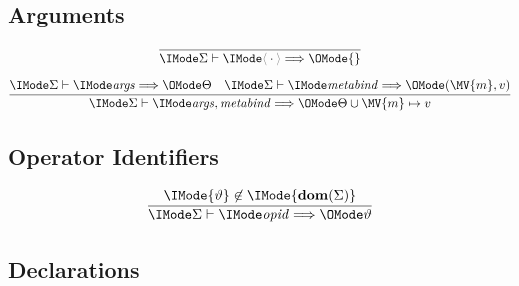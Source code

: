\documentclass{report}
\begin{document}
\subsection*{Arguments\hfill \framebox{$\Elab{\Sigma}{\SortArgs}{\Theta}$}}

\begin{gather}
  \infer{
    \Elab{\Sigma}{\EmptyCtx}{\{\}}
  }{
  }\\[6pt]
  \infer{
    \Elab{\Sigma}{\ExtendCtx{\SortArgs}{\SortMetaBind}}{
      \Theta\cup{\MV{m} \mapsto v}
    }
  }{
    \Elab{\Sigma}{\SortArgs}{\Theta} &
    \Elab{\Sigma}{\SortMetaBind}{(\MV{m}, v)}
  }
\end{gather}

\subsection*{Operator Identifiers\hfill \framebox{$\Elab{\Sigma}{\SortOpId}{\vartheta}$}}

\begin{gather}
  \infer{
    \Elab{\Sigma}{\SortOpId}{\vartheta}
  }{
    \IMode{\vartheta}\not\in\IMode{\mathbf{dom}(\Sigma)}
  }
\end{gather}

\subsection*{Declarations\hfill {}}
\end{document}
